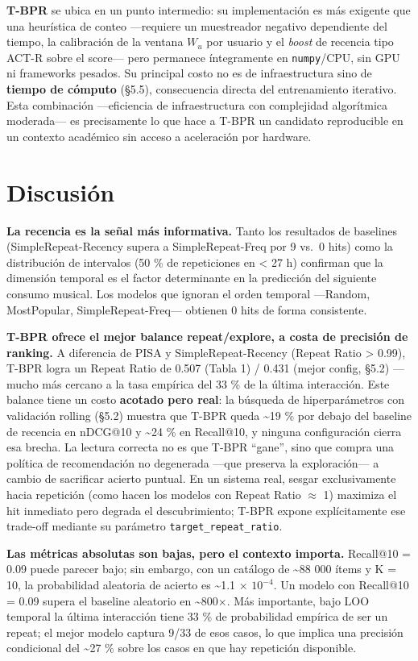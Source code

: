 \documentclass{article}
\begin{document}
\textbf{T-BPR} se ubica en un punto intermedio: su implementación es más exigente que una heurística de conteo ---requiere un muestreador negativo dependiente del tiempo, la calibración de la ventana \(W_u\) por usuario y el \emph{boost} de recencia tipo ACT-R sobre el score--- pero permanece íntegramente en \texttt{numpy}/CPU, sin GPU ni frameworks pesados. Su principal costo no es de infraestructura sino de \textbf{tiempo de cómputo} (§5.5), consecuencia directa del entrenamiento iterativo. Esta combinación ---eficiencia de infraestructura con complejidad algorítmica moderada--- es precisamente lo que hace a T-BPR un candidato reproducible en un contexto académico sin acceso a aceleración por hardware.

\section{Discusión}\label{discusiuxf3n}

\textbf{La recencia es la señal más informativa.} Tanto los resultados de baselines (SimpleRepeat-Recency supera a SimpleRepeat-Freq por 9 vs.~0 hits) como la distribución de intervalos (50 \% de repeticiones en \textless{} 27 h) confirman que la dimensión temporal es el factor determinante en la predicción del siguiente consumo musical. Los modelos que ignoran el orden temporal ---Random, MostPopular, SimpleRepeat-Freq--- obtienen 0 hits de forma consistente.

\textbf{T-BPR ofrece el mejor balance repeat/explore, a costa de precisión de ranking.} A diferencia de PISA y SimpleRepeat-Recency (Repeat Ratio \textgreater{} 0.99), T-BPR logra un Repeat Ratio de 0.507 (Tabla 1) / 0.431 (mejor config, §5.2) ---mucho más cercano a la tasa empírica del 33 \% de la última interacción. Este balance tiene un costo \textbf{acotado pero real}: la búsqueda de hiperparámetros con validación rolling (§5.2) muestra que T-BPR queda \textasciitilde19 \% por debajo del baseline de recencia en nDCG@10 y \textasciitilde24 \% en Recall@10, y ninguna configuración cierra esa brecha. La lectura correcta no es que T-BPR ``gane'', sino que compra una política de recomendación no degenerada ---que preserva la exploración--- a cambio de sacrificar acierto puntual. En un sistema real, sesgar exclusivamente hacia repetición (como hacen los modelos con Repeat Ratio $\approx$ 1) maximiza el hit inmediato pero degrada el descubrimiento; T-BPR expone explícitamente ese trade-off mediante su parámetro \texttt{target\_repeat\_ratio}.

\textbf{Las métricas absolutas son bajas, pero el contexto importa.} Recall@10 = 0.09 puede parecer bajo; sin embargo, con un catálogo de \textasciitilde88 000 ítems y K = 10, la probabilidad aleatoria de acierto es \textasciitilde1.1 $\times$ $10^{-4}$. Un modelo con Recall@10 = 0.09 supera el baseline aleatorio en \textasciitilde800$\times$. Más importante, bajo LOO temporal la última interacción tiene 33 \% de probabilidad empírica de ser un repeat; el mejor modelo captura 9/33 de esos casos, lo que implica una precisión condicional del \textasciitilde27 \% sobre los casos en que hay repetición disponible.
\end{document}
